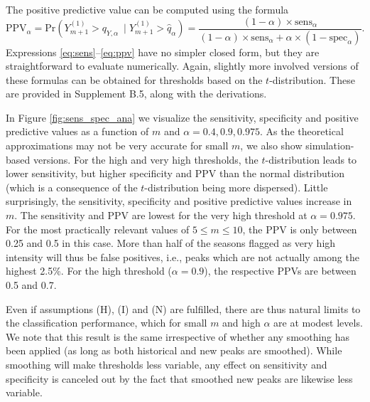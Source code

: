\documentclass[12pt]{article}
\begin{document}
The positive predictive value can be computed using the formula \citep{Altman1994}
\begin{equation}
\text{PPV}_\alpha = \text{Pr}(Y_{m + 1}^{(1)} > q_{Y, \alpha} \ \mid Y_{m + 1}^{(1)} > \hat{q}_\alpha) = \frac{(1 - \alpha) \times \text{sens}_\alpha}{(1 - \alpha) \times \text{sens}_\alpha + \alpha \times (1 - \text{spec}_\alpha)}.
\label{eq:ppv}
\end{equation}
Expressions \eqref{eq:sens}--\eqref{eq:ppv} have no simpler closed form, but they are straightforward to evaluate numerically. Again, slightly more involved versions of these formulas can be obtained for thresholds based on the $t$-distribution. These are provided in Supplement B.5, along with the derivations.

In Figure \ref{fig:sens_spec_ana} we visualize the sensitivity, specificity and positive predictive values as a function of $m$ and $\alpha = 0.4, 0.9, 0.975 $. As the theoretical approximations may not be very accurate for small $m$, we also show simulation-based versions. For the high and very high thresholds, the $t$-distribution leads to lower sensitivity, but higher specificity and PPV than the normal distribution (which is a consequence of the $t$-distribution being more dispersed). Little surprisingly, the sensitivity, specificity and positive predictive values increase in $m$. The sensitivity and PPV are lowest for the very high threshold at $\alpha = 0.975$. For the most practically relevant values of $5 \leq m \leq 10$, the PPV is only between 0.25 and 0.5 in this case. More than half of the seasons flagged as very high intensity will thus be false positives, i.e., peaks which are not actually among the highest 2.5\%. For the high threshold ($\alpha = 0.9$), the respective PPVs are between 0.5 and 0.7.

Even if assumptions (H), (I) and (N) are fulfilled, there are thus natural limits to the classification performance, which for small $m$ and high $\alpha$ are at modest levels. We note that this result is the same irrespective of whether any smoothing has been applied (as long as both historical and new peaks are smoothed). While smoothing will make thresholds less variable, any effect on sensitivity and specificity is canceled out by the fact that smoothed new peaks are likewise less variable.
\end{document}
